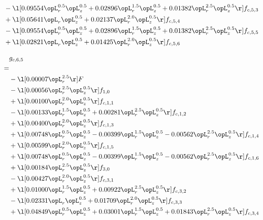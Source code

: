 \begin{alignat}{2}
& - \l[  0.09554 \opL_r^{0.5} \opL_z^{0.5} +  0.02896 \opL_r^{1.5} \opL_z^{0.5} +  0.01382 \opL_r^{2.5} \opL_z^{0.5}  \r] f_{c,5,3} \nonumber \\ 
& + \l[  0.05641 \opL_r \opL_z^{0.5} +  0.02137 \opL_r^{2.0} \opL_z^{0.5}  \r] f_{c,5,4} \nonumber \\ 
& - \l[  0.09554 \opL_r^{0.5} \opL_z^{0.5} +  0.02896 \opL_r^{1.5} \opL_z^{0.5} +  0.01382 \opL_r^{2.5} \opL_z^{0.5}  \r] f_{c,5,5} \nonumber \\ 
& + \l[  0.02821 \opL_r \opL_z^{0.5} +  0.01425 \opL_r^{2.0} \opL_z^{0.5}  \r] f_{c,5,6} \nonumber \\ 
\end{alignat} 


\begin{alignat}{2} 
\label{eq:g_65_0} 
& g_{c,6,5} \nonumber \\ 
 = \\ 
& - \l[  0.00007 \opL_r^{2.5}  \r] F \nonumber \\ 
& - \l[  0.00056 \opL_r^{2.5} \opL_z^{0.5}  \r] f_{1,0} \nonumber \\ 
& + \l[  0.00100 \opL_r^{2.0} \opL_z^{0.5}  \r] f_{c,1,1} \nonumber \\ 
& - \l[  0.00133 \opL_r^{1.5} \opL_z^{0.5} +  0.00281 \opL_r^{2.5} \opL_z^{0.5}  \r] f_{c,1,2} \nonumber \\ 
& + \l[  0.00400 \opL_r^{2.0} \opL_z^{0.5}  \r] f_{c,1,3} \nonumber \\ 
& + \l[  0.00748 \opL_r^{0.5} \opL_z^{0.5}   -0.00399 \opL_r^{1.5} \opL_z^{0.5}   -0.00562 \opL_r^{2.5} \opL_z^{0.5}  \r] f_{c,1,4} \nonumber \\ 
& + \l[  0.00599 \opL_r^{2.0} \opL_z^{0.5}  \r] f_{c,1,5} \nonumber \\ 
& + \l[  0.00748 \opL_r^{0.5} \opL_z^{0.5}   -0.00399 \opL_r^{1.5} \opL_z^{0.5}   -0.00562 \opL_r^{2.5} \opL_z^{0.5}  \r] f_{c,1,6} \nonumber \\ 
& + \l[  0.00184 \opL_r^{2.5} \opL_z^{0.5}  \r] f_{3,0} \nonumber \\ 
& - \l[  0.00427 \opL_r^{2.0} \opL_z^{0.5}  \r] f_{c,3,1} \nonumber \\ 
& + \l[  0.01000 \opL_r^{1.5} \opL_z^{0.5} +  0.00922 \opL_r^{2.5} \opL_z^{0.5}  \r] f_{c,3,2} \nonumber \\ 
& - \l[  0.02331 \opL_r \opL_z^{0.5} +  0.01709 \opL_r^{2.0} \opL_z^{0.5}  \r] f_{c,3,3} \nonumber \\ 
& + \l[  0.04849 \opL_r^{0.5} \opL_z^{0.5} +  0.03001 \opL_r^{1.5} \opL_z^{0.5} +  0.01843 \opL_r^{2.5} \opL_z^{0.5}  \r] f_{c,3,4} \nonumber \\ 

\end{alignat}
